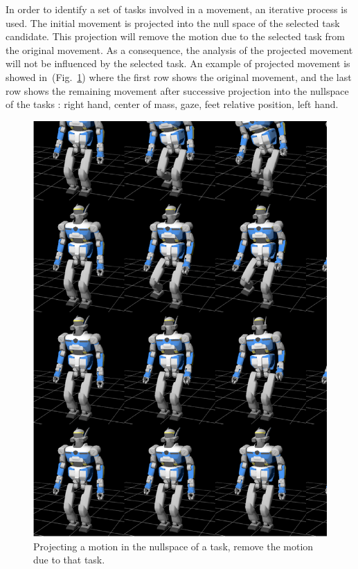 \documentclass[letterpaper, 10pt, conference]{ieeeconf}      %
\begin{document}
In order to identify a set of tasks involved in a movement, an iterative
process is used. The initial movement is projected into the null space of the
selected task candidate. This projection will remove the motion due to the
selected task from the original movement. As a consequence,
the analysis of the projected movement will not be influenced by
the selected task. An example of projected movement is showed in~(Fig.~\ref{fig:nullspace})
where the first row shows the original movement, and the last row shows the
remaining movement after successive projection into the nullspace of the tasks
: right hand, center of mass, gaze, feet relative position, left hand.
\begin{figure}[t]
\begin{center}
\includegraphics[width=0.9\linewidth]{img/nullspaceProjection.ps}
\end{center}
\caption{Projecting a motion in the nullspace of a task, remove the motion
	due to that task. }
\label{fig:nullspace}
\end{figure}
\end{document}
